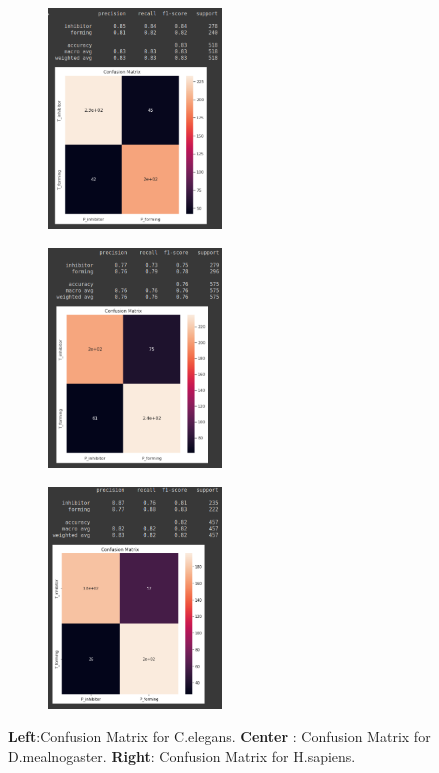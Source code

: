\documentclass{article}
\begin{document}
\begin{figure}[]
  \centering
  \begin{subfigure}{4.6cm}
    \centering\includegraphics[width=4.6cm]{C_elegans_all_cm.png}
  \end{subfigure}
  \begin{subfigure}{4.6cm}
    \centering\includegraphics[width=4.6cm]{D.mealnogaster_all_cm.png}
  \end{subfigure}
  \begin{subfigure}{4.6cm}
    \centering\includegraphics[width=4.6cm]{sapiens_all_cm.png}
  \end{subfigure}
  \caption{ 
  \textbf{Left}:Confusion Matrix for  C.elegans.
  \textbf{Center} : Confusion Matrix for  D.mealnogaster.
  \textbf{Right}: Confusion Matrix for  H.sapiens.}
  \label{fig:cm_all}
\end{figure}
\end{document}
